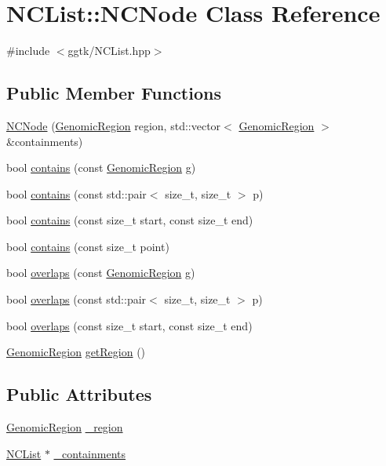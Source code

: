 \hypertarget{classNCList_1_1NCNode}{}\section{N\+C\+List\+:\+:N\+C\+Node Class Reference}
\label{classNCList_1_1NCNode}


{\ttfamily \#include $<$ggtk/\+N\+C\+List.\+hpp$>$}

\subsection*{Public Member Functions}
\begin{DoxyCompactItemize}
\item 
\hyperlink{classNCList_1_1NCNode_af213aa74a3ce198f18f85d56135e927c}{N\+C\+Node} (\hyperlink{classGenomicRegion}{Genomic\+Region} region, std\+::vector$<$ \hyperlink{classGenomicRegion}{Genomic\+Region} $>$ \&containments)
\item 
bool \hyperlink{classNCList_1_1NCNode_a171e5700a93bd6fe87cc19201b51c511}{contains} (const \hyperlink{classGenomicRegion}{Genomic\+Region} g)
\item 
bool \hyperlink{classNCList_1_1NCNode_aed822cb1840061636984d861a2bf6dc1}{contains} (const std\+::pair$<$ size\+\_\+t, size\+\_\+t $>$ p)
\item 
bool \hyperlink{classNCList_1_1NCNode_a7a1dd138ac17fefb6372428d7368fc2f}{contains} (const size\+\_\+t start, const size\+\_\+t end)
\item 
bool \hyperlink{classNCList_1_1NCNode_a321a463ec67ae56320e292684ccf4f05}{contains} (const size\+\_\+t point)
\item 
bool \hyperlink{classNCList_1_1NCNode_a08dc4cd04cd5f055c795e14015fe99d5}{overlaps} (const \hyperlink{classGenomicRegion}{Genomic\+Region} g)
\item 
bool \hyperlink{classNCList_1_1NCNode_adfcf156f611082e8a878cac5144d57f6}{overlaps} (const std\+::pair$<$ size\+\_\+t, size\+\_\+t $>$ p)
\item 
bool \hyperlink{classNCList_1_1NCNode_a480672401a51f10fced603acbd913823}{overlaps} (const size\+\_\+t start, const size\+\_\+t end)
\item 
\hyperlink{classGenomicRegion}{Genomic\+Region} \hyperlink{classNCList_1_1NCNode_a1f892f4b4baea2b6d36b8eb2e92c8181}{get\+Region} ()
\end{DoxyCompactItemize}
\subsection*{Public Attributes}
\begin{DoxyCompactItemize}
\item 
\hyperlink{classGenomicRegion}{Genomic\+Region} \hyperlink{classNCList_1_1NCNode_a369bc4997b8d3ff5c9c5951bd25ae52a}{\+\_\+region}
\item 
\hyperlink{classNCList}{N\+C\+List} $\ast$ \hyperlink{classNCList_1_1NCNode_a112ccb41d149a0b9f9ee3e7d10267f48}{\+\_\+containments}
\end{DoxyCompactItemize}


